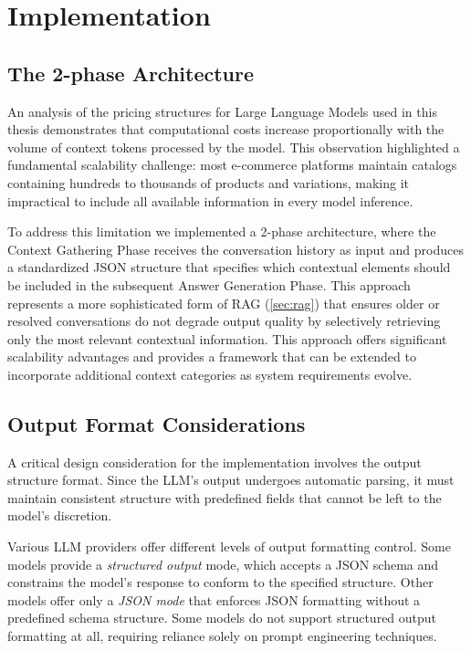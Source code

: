 \chapter{Implementation}
\label{cha:impl}


\section{The 2-phase Architecture}

An analysis of the pricing structures for Large Language Models used in this thesis \cite{gemini_pricing, anthropic_pricing, deepseek_pricing, openai_pricing} demonstrates that computational costs increase proportionally with the volume of context tokens processed by the model.
This observation highlighted a fundamental scalability challenge: most e-commerce platforms maintain catalogs containing hundreds to thousands of products and variations, making it impractical to include all available information in every model inference.

To address this limitation we implemented a 2-phase architecture, where the Context Gathering Phase receives the conversation history as input and produces a standardized JSON structure that specifies which contextual elements should be included in the subsequent Answer Generation Phase.
This approach represents a more sophisticated form of RAG (\cref{sec:rag}) that ensures older or resolved conversations do not degrade output quality by selectively retrieving only the most relevant contextual information.
This approach offers significant scalability advantages and provides a framework that can be extended to incorporate additional context categories as system requirements evolve.

\section{Output Format Considerations}
\label{sec:output_format}

A critical design consideration for the implementation involves the output structure format. Since the LLM's output undergoes automatic parsing, it must maintain consistent structure with predefined fields that cannot be left to the model's discretion.

Various LLM providers offer different levels of output formatting control. Some models provide a \textit{structured output} mode, which accepts a JSON schema and constrains the model's response to conform to the specified structure. Other models offer only a \textit{JSON mode} that enforces JSON formatting without a predefined schema structure.
Some models do not support structured output formatting at all, requiring reliance solely on prompt engineering techniques.


